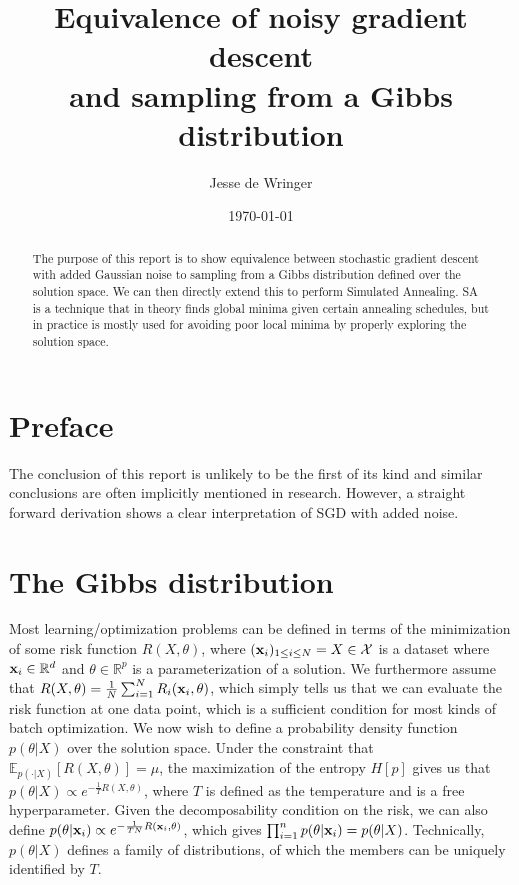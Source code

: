 \documentclass[twocolumn]{article}
\title{Equivalence of noisy gradient descent\\and sampling from a Gibbs distribution}
\author{Jesse de Wringer}
\date{\today}
\begin{document}
\maketitle
\begin{abstract}
The purpose of this report is to show equivalence between stochastic gradient descent with added Gaussian noise to sampling from a Gibbs distribution defined over the solution space. We can then directly extend this to perform Simulated Annealing. SA is a technique that in theory finds global minima given certain annealing schedules, but in practice is mostly used for avoiding poor local minima by properly exploring the solution space.
\end{abstract}

\section{Preface}
The conclusion of this report is unlikely to be the first of its kind and similar conclusions are often implicitly mentioned in research. However, a straight forward derivation shows a clear interpretation of SGD with added noise.

\section{The Gibbs distribution}
Most learning/optimization problems can be defined in terms of the minimization of some risk function $R(X, \theta)$, where $(\bold{x}_i)_{1\leq i \leq N} = X\in \mathcal{X}$ is a dataset where $\bold{x}_i \in \mathbb{R}^d$ and $\theta \in \mathbb{R}^p$ is a parameterization of a solution. We furthermore assume that $R(X, \theta) = \frac{1}{N} \sum_{i=1}^NR_i(\bold{x}_i, \theta)$, which simply tells us that we can evaluate the risk function at one data point, which is a sufficient condition for most kinds of batch optimization. We now wish to define a probability density function $p(\theta|X)$ over the solution space. Under the constraint that $\mathbb{E}_{p(\cdot|X)}[R(X, \theta)] = \mu$, the maximization of the entropy $H[p]$ gives us that $p(\theta|X) \propto e^{-\frac{1}{T}R(X, \theta)}$, where $T$ is defined as the temperature and is a free hyperparameter. Given the decomposability condition on the risk, we can also define $p(\theta|\bold{x}_i) \propto e^{-\frac{1}{TN}R(\bold{x}_i, \theta)}$, which gives $\prod_{i=1}^n p(\theta|\bold{x}_i) = p(\theta|X)$. Technically, $p(\theta|X)$ defines a family of distributions, of which the members can be uniquely identified by $T$.
\end{document}
